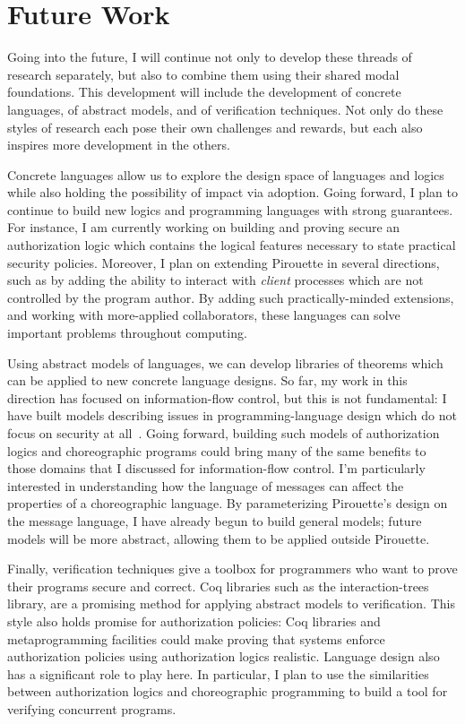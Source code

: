 \documentclass{article}
\theoremstyle{definition}
\begin{document}
\section*{Future Work}

Going into the future, I will continue not only to develop these threads of research separately, but also to combine them using their shared modal foundations.
This development will include the development of concrete languages, of abstract models, and of verification techniques.
Not only do these styles of research each pose their own challenges and rewards, but each also inspires more development in the others.

Concrete languages allow us to explore the design space of languages and logics while also holding the possibility of impact via adoption.
Going forward, I plan to continue to build new logics and programming languages with strong guarantees.
For instance, I am currently working on building and proving secure an authorization logic which contains the logical features necessary to state practical security policies.
Moreover, I plan on extending Pirouette in several directions, such as by adding the ability to interact with \emph{client} processes which are not controlled by the program author.
By adding such practically-minded extensions, and working with more-applied collaborators, these languages can solve important problems throughout computing.

Using abstract models of languages, we can develop libraries of theorems which can be applied to new concrete language designs.
So far, my work in this direction has focused on information-flow control, but this is not fundamental: I have built models describing issues in programming-language design which do not focus on security at all~\citep{HirschT18}.
Going forward, building such models of authorization logics and choreographic programs could bring many of the same benefits to those domains that I discussed for information-flow control.
I'm particularly interested in understanding how the language of messages can affect the properties of a choreographic language.
By parameterizing Pirouette's design on the message language, I have already begun to build general models; future models will be more abstract, allowing them to be applied outside Pirouette.

Finally, verification techniques give a toolbox for programmers who want to prove their programs secure and correct.
Coq libraries such as the interaction-trees library, are a promising method for applying abstract models to verification.
This style also holds promise for authorization policies: Coq libraries and metaprogramming facilities could make proving that systems enforce authorization policies using authorization logics realistic.
Language design also has a significant role to play here.
In particular, I plan to use the similarities between authorization logics and choreographic programming to build a tool for verifying concurrent programs.


\end{document}
